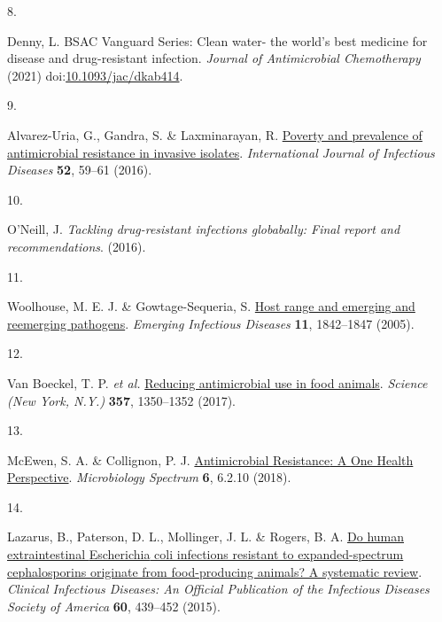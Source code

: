 \documentclass[
]{book}
\newlength{\cslhangindent}
\newlength{\csllabelwidth}
\newlength{\cslentryspacingunit} %
\newenvironment{CSLReferences}[2] %
 {%
  \setlength{\parindent}{0pt}
  \ifodd #1
  \let\oldpar\par
  \def\par{\hangindent=\cslhangindent\oldpar}
  \fi
  \setlength{\parskip}{#2\cslentryspacingunit}
 }%
 {}
\newcommand{\CSLLeftMargin}[1]{\parbox[t]{\csllabelwidth}{#1}}
\newcommand{\CSLRightInline}[1]{\parbox[t]{\linewidth - \csllabelwidth}{#1}\break}
\begin{document}
\begin{CSLReferences}{0}{0}
\leavevmode{}%
\CSLLeftMargin{8. }
\CSLRightInline{Denny, L. {BSAC Vanguard Series}: Clean water- the world's best medicine for disease and drug-resistant infection. \emph{Journal of Antimicrobial Chemotherapy} (2021) doi:\href{https://doi.org/10.1093/jac/dkab414}{10.1093/jac/dkab414}.}

\leavevmode{}%
\CSLLeftMargin{9. }
\CSLRightInline{Alvarez-Uria, G., Gandra, S. \& Laxminarayan, R. \href{https://doi.org/10.1016/j.ijid.2016.09.026}{Poverty and prevalence of antimicrobial resistance in invasive isolates}. \emph{International Journal of Infectious Diseases} \textbf{52}, 59--61 (2016).}

\leavevmode{}%
\CSLLeftMargin{10. }
\CSLRightInline{O'Neill, J. \emph{Tackling drug-resistant infections globabally: Final report and recommendations}. (2016).}

\leavevmode{}%
\CSLLeftMargin{11. }
\CSLRightInline{Woolhouse, M. E. J. \& Gowtage-Sequeria, S. \href{https://doi.org/10.3201/eid1112.050997}{Host range and emerging and reemerging pathogens}. \emph{Emerging Infectious Diseases} \textbf{11}, 1842--1847 (2005).}

\leavevmode{}%
\CSLLeftMargin{12. }
\CSLRightInline{Van Boeckel, T. P. \emph{et al.} \href{https://doi.org/10.1126/science.aao1495}{Reducing antimicrobial use in food animals}. \emph{Science (New York, N.Y.)} \textbf{357}, 1350--1352 (2017).}

\leavevmode{}%
\CSLLeftMargin{13. }
\CSLRightInline{McEwen, S. A. \& Collignon, P. J. \href{https://doi.org/10.1128/microbiolspec.ARBA-0009-2017}{Antimicrobial {Resistance}: A {One Health Perspective}}. \emph{Microbiology Spectrum} \textbf{6}, 6.2.10 (2018).}

\leavevmode{}%
\CSLLeftMargin{14. }
\CSLRightInline{Lazarus, B., Paterson, D. L., Mollinger, J. L. \& Rogers, B. A. \href{https://doi.org/10.1093/cid/ciu785}{Do human extraintestinal {Escherichia} coli infections resistant to expanded-spectrum cephalosporins originate from food-producing animals? A systematic review}. \emph{Clinical Infectious Diseases: An Official Publication of the Infectious Diseases Society of America} \textbf{60}, 439--452 (2015).}


\end{CSLReferences}
\end{document}
